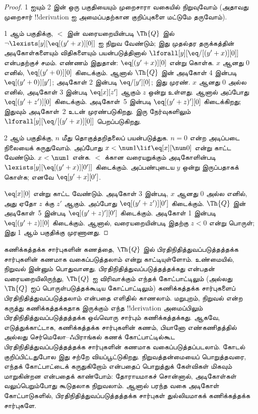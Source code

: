 \documentclass[../../../include/open-logic-section]{subfiles}
\begin{document}
\begin{proof}
1 ஐயும் 2 இன் ஒரு பகுதியையும் முறைசாரா வகையில் நிறுவுவோம்
(அதாவது முறைசார் !!{derivation} ஐ அமைப்பதற்கான குறிப்புகளை மட்டுமே
தருவோம்).

1 ஆம் பகுதிக்கு, $<$ இன் வரையறையின்படி
$\Th{Q}$ இல்
$\lnot \lexists[y][\eq[(y'+x)][0]]$
ஐ நிறுவ வேண்டும்; இது முதல்தர தருக்கத்தின் அடிகோள்களையும் விதிகளையும்
பயன்படுத்தினால்
$\lforall[y][\eq/[(y' +
    x)][0]]$
என்பதற்குச் சமம். எண்ணம் இதுதான்: $\eq[(y'+x)][0]$
என்று கொள்க. $x$ ஆனது 0 எனில், $\eq[(y' + 0)][0]$
கிடைக்கும். ஆனால் $\Th{Q}$ இன் அடிகோள் 4 இன்படி
$\eq[(y' + 0)][y']$; அடிகோள் 2 இன்படி
$\eq/[y'][0]$; இது முரண்.
$x$ ஆனது $0$ அல்ல எனில், அடிகோள் 3 இன்படி
$\eq[x][z']$ ஆகும் $z$ ஒன்று உள்ளது. ஆனால் அப்போது
$\eq[(y' + z')][0]$ கிடைக்கும். அடிகோள்~5 இன்படி
$\eq[(y' + z)'][0]$ கிடைக்கிறது; இதுவும் அடிகோள்~2 உடன்
முரண்படுகிறது. இரு நேர்வுகளிலும்
$\lforall[y][\eq/[(y' +x)][0]]$ பெறப்படுகிறது.

2 ஆம் பகுதிக்கு, $n$ மீது தொகுத்தறிதலைப் பயன்படுத்துக.
$n =0$ என்ற அடிப்படை நிலையைக் கருதுவோம். அப்போது
$x < \num 1 \lif \eq[x][\num
  0]$ என்று காட்ட வேண்டும். $x < \num 1$ என்க.
$<$ க்கான வரையறுக்கும் அடிகோளின்படி
$\lexists[y][\eq[(y'+x)][0']]$ கிடைக்கும்.
அப்பண்புடைய $y$ ஒன்று இருப்பதாகக் கொள்க; எனவே
$\eq[y'+x][0']$.

$\eq[x][0]$ என்று காட்ட வேண்டும். அடிகோள் 3 இன்படி,
$x$ ஆனது 0 அல்ல எனில், அது ஏதோ $z$ க்கு $z'$ ஆகும்.
அப்போது $\eq[(y' + z')][0']$ கிடைக்கும்.
$\Th{Q}$ இன் அடிகோள்~5 இன்படி
$\eq[(y'+z)'][0']$ கிடைக்கும். அடிகோள் 1 இன்படி
$\eq[(y' +
    z)][0]$ கிடைக்கும். ஆனால், வரையறையின்படி இதற்கு
$z < 0$ என்று பொருள்; இது 1 ஆம் பகுதிக்கு முரணானது.
\end{proof}

\begin{explain}
கணிக்கத்தக்க சார்புகளின் கணத்தை, $\Th{Q}$ இல்
பிரதிநிதித்துவப்படுத்தத்தக்க சார்புகளின் கணமாக வகைப்படுத்தலாம் என்று
காட்டியுள்ளோம். உண்மையில், நிறுவல் இன்னும் பொதுவானது.
பிரதிநிதித்துவப்படுத்தத்தக்கது என்பதன் வரையறையிலிருந்து,
$\Th{Q}$ ஐ விரிவாக்கும் எந்தக் கோட்பாட்டிலும்
(அல்லது $\Th{Q}$ ஐப் பொருள்படுத்தக்கூடிய கோட்பாட்டிலும்)
கணிக்கத்தக்க சார்புகளைப் பிரதிநிதித்துவப்படுத்தலாம் என்பதை
எளிதில் காணலாம். மறுபுறம், நிறுவல் என்ற கருத்து கணிக்கத்தக்கதாக
இருக்கும் எந்த !!{derivation} அமைப்பிலும் பிரதிநிதித்துவப்படுத்தத்தக்க
ஒவ்வொரு சார்பும் கணிக்கத்தக்கது. ஆகவே, எடுத்துக்காட்டாக,
கணிக்கத்தக்க சார்புகளின் கணம், பியானோ எண்கணிதத்தில் அல்லது
செர்மெலோ--ஃபிராங்கல் கணக் கோட்பாட்டில்கூட
பிரதிநிதித்துவப்படுத்தத்தக்க சார்புகளின் கணமாக வகைப்படுத்தப்படலாம்.
கோடல் குறிப்பிட்டதுபோல இது சற்றே வியப்பூட்டுகிறது.
நிறுவத்தன்மையைப் பொறுத்தவரை, எந்தக் கோட்பாட்டைக் கருதுகிறோம்
என்பதைப் பொறுத்துக் கேள்விகள் மிகவும் மாறுகின்றன என்பதைக் காண்போம்:
தோராயமாகச் சொன்னால், அடிகோள்கள் வலுப்பெறும்போது கூடுதலாக நிறுவலாம்.
ஆனால் பரந்த வகை அடிகோள் கோட்பாடுகளில், பிரதிநிதித்துவப்படுத்தத்தக்க
சார்புகள் துல்லியமாகக் கணிக்கத்தக்க சார்புகளே.
\end{explain}
\end{document}
